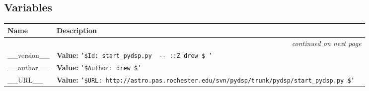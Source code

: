   \subsection{Variables}

\begin{longtable}{|p{}|p{}|l}
\cline{1-2}
\cline{1-2} \centering \textbf{Name} & \centering \textbf{Description}& \\
\cline{1-2}
\endhead\cline{1-2}\multicolumn{3}{r}{\small\textit{continued on next page}}\\\endfoot\cline{1-2}
\endlastfoot\raggedright \_\-\_\-v\-e\-r\-s\-i\-o\-n\-\_\-\_\- & \textbf{Value:} 
{\tt '\-\$\-I\-d\-:\-~\-s\-t\-a\-r\-t\-\_\-p\-y\-d\-s\-p\-.\-p\-y\-~\-3\-9\-8\-~\-2\-0\-0\-6\--\-0\-6\--\-0\-3\-~\-2\-2\-:\-2\-1\-:\-5\-2\-Z\-~\-d\-r\-e\-w\-~\-\$\-~\-'\-}&\\
\cline{1-2}
\raggedright \_\-\_\-a\-u\-t\-h\-o\-r\-\_\-\_\- & \textbf{Value:} 
{\tt '\-\$\-A\-u\-t\-h\-o\-r\-:\-~\-d\-r\-e\-w\-~\-\$\-'\-}&\\
\cline{1-2}
\raggedright \_\-\_\-U\-R\-L\-\_\-\_\- & \textbf{Value:} 
{\tt '\-\$\-U\-R\-L\-:\-~\-h\-t\-t\-p\-:\-/\-/\-a\-s\-t\-r\-o\-.\-p\-a\-s\-.\-r\-o\-c\-h\-e\-s\-t\-e\-r\-.\-e\-d\-u\-/\-s\-v\-n\-/\-p\-y\-d\-s\-p\-/\-t\-r\-u\-n\-k\-/\-p\-y\-d\-s\-p\-/\-s\-t\-a\-r\-t\-\_\-p\-y\-d\-s\-p\-.\-p\-y\-~\-\$\-'\-}&\\
\cline{1-2}
\end{longtable}

